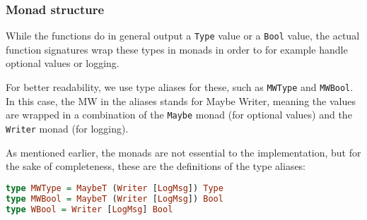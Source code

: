 \subsubsection{Monad structure}
While the functions do in general output a \lstinline{Type} value or a \lstinline{Bool} value, the actual function signatures wrap these types in monads in order to for example handle optional values or logging.
\par For better readability, we use type aliases for these, such as \lstinline{MWType} and \lstinline{MWBool}.  In this case, the MW in the aliases stands for Maybe Writer, meaning the values are wrapped in a combination of the \lstinline{Maybe} monad (for optional values) and the \lstinline{Writer} monad (for logging).
\par As mentioned earlier, the monads are not essential to the implementation, but for the sake of completeness, these are the definitions of the type aliases:
\begin{lstlisting}[language=haskell, 
caption={Type aliases of monads used in type checker implementation}]
type MWType = MaybeT (Writer [LogMsg]) Type
type MWBool = MaybeT (Writer [LogMsg]) Bool
type WBool = Writer [LogMsg] Bool
\end{lstlisting}

\newpage
